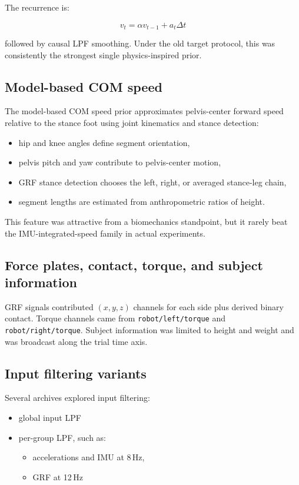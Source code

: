 \documentclass[11pt,a4paper]{article}
\begin{document}
The recurrence is:

\[
v_t = \alpha v_{t-1} + a_t \Delta t
\]

followed by causal LPF smoothing. Under the old target protocol, this was consistently the strongest single physics-inspired prior.

\subsection{Model-based COM speed}

The model-based COM speed prior approximates pelvis-center forward speed relative to the stance foot using joint kinematics and stance detection:

\begin{itemize}
\item hip and knee angles define segment orientation,
\item pelvis pitch and yaw contribute to pelvis-center motion,
\item GRF stance detection chooses the left, right, or averaged stance-leg chain,
\item segment lengths are estimated from anthropometric ratios of height.
\end{itemize}

This feature was attractive from a biomechanics standpoint, but it rarely beat the IMU-integrated-speed family in actual experiments.

\subsection{Force plates, contact, torque, and subject information}

GRF signals contributed \((x,y,z)\) channels for each side plus derived binary contact. Torque channels came from \texttt{robot/left/torque} and \texttt{robot/right/torque}. Subject information was limited to height and weight and was broadcast along the trial time axis.

\subsection{Input filtering variants}

Several archives explored input filtering:

\begin{itemize}
\item global input LPF
\item per-group LPF, such as:
  \begin{itemize}
  \item accelerations and IMU at 8\,Hz,
  \item GRF at 12\,Hz
  \end{itemize}
\end{itemize}
\end{document}
